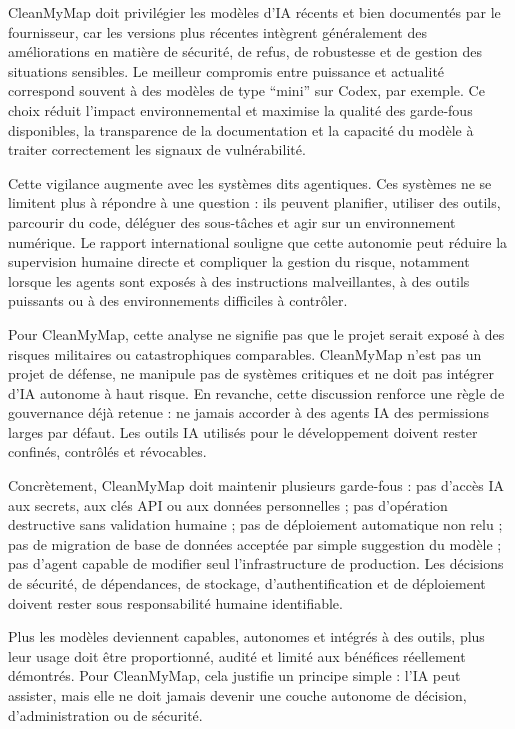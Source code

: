 \documentclass[
  10pt,
  a4paper,
  DIV=11,
  numbers=noendperiod,
  oneside]{scrreprt}
\begin{document}
CleanMyMap doit privilégier les modèles d'IA récents et bien documentés
par le fournisseur, car les versions plus récentes intègrent
généralement des améliorations en matière de sécurité, de refus, de
robustesse et de gestion des situations sensibles. Le meilleur compromis
entre puissance et actualité correspond souvent à des modèles de type
``mini'' sur Codex, par exemple. Ce choix réduit l'impact
environnemental et maximise la qualité des garde-fous disponibles, la
transparence de la documentation et la capacité du modèle à traiter
correctement les signaux de vulnérabilité.

Cette vigilance augmente avec les systèmes dits agentiques. Ces systèmes
ne se limitent plus à répondre à une question : ils peuvent planifier,
utiliser des outils, parcourir du code, déléguer des sous-tâches et agir
sur un environnement numérique. Le rapport international souligne que
cette autonomie peut réduire la supervision humaine directe et
compliquer la gestion du risque, notamment lorsque les agents sont
exposés à des instructions malveillantes, à des outils puissants ou à
des environnements difficiles à contrôler.

Pour CleanMyMap, cette analyse ne signifie pas que le projet serait
exposé à des risques militaires ou catastrophiques comparables.
CleanMyMap n'est pas un projet de défense, ne manipule pas de systèmes
critiques et ne doit pas intégrer d'IA autonome à haut risque. En
revanche, cette discussion renforce une règle de gouvernance déjà
retenue : ne jamais accorder à des agents IA des permissions larges par
défaut. Les outils IA utilisés pour le développement doivent rester
confinés, contrôlés et révocables.

Concrètement, CleanMyMap doit maintenir plusieurs garde-fous : pas
d'accès IA aux secrets, aux clés API ou aux données personnelles ; pas
d'opération destructive sans validation humaine ; pas de déploiement
automatique non relu ; pas de migration de base de données acceptée par
simple suggestion du modèle ; pas d'agent capable de modifier seul
l'infrastructure de production. Les décisions de sécurité, de
dépendances, de stockage, d'authentification et de déploiement doivent
rester sous responsabilité humaine identifiable.

Plus les modèles deviennent capables, autonomes et intégrés à des
outils, plus leur usage doit être proportionné, audité et limité aux
bénéfices réellement démontrés. Pour CleanMyMap, cela justifie un
principe simple : l'IA peut assister, mais elle ne doit jamais devenir
une couche autonome de décision, d'administration ou de sécurité.
\end{document}
